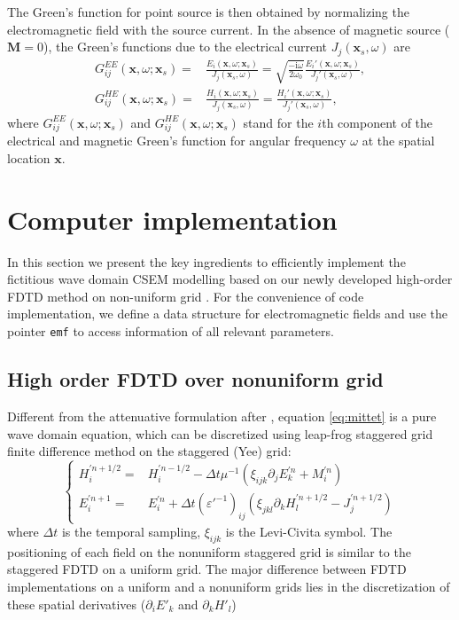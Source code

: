 \documentclass[a4paper,10pt]{article}
\begin{document}
The Green's function for point source is then obtained by normalizing the electromagnetic field with the source current. In the absence of magnetic source ($\mathbf{M}=0$),  the Green's functions due to the electrical current $J_j(\mathbf{x}_s,\omega)$ are
 \begin{subequations}\label{eq:greenfunction}
   \begin{align}
  G_{ij}^{EE}(\mathbf{x},\omega;\mathbf{x}_s) =& \frac{E_i(\mathbf{x},\omega;\mathbf{x}_s)}{J_j(\mathbf{x}_s,\omega)}
  =\sqrt{\frac{-\mathrm{i}\omega}{2\omega_0}}\frac{E_i'(\mathbf{x},\omega;\mathbf{x}_s)}{J_j'(\mathbf{x}_s,\omega)}, \\
  G_{ij}^{HE}(\mathbf{x},\omega;\mathbf{x}_s) = &\frac{H_i(\mathbf{x},\omega;\mathbf{x}_s)}{J_j(\mathbf{x}_s,\omega)}
  =\frac{H_i'(\mathbf{x},\omega;\mathbf{x}_s)}{J_j'(\mathbf{x}_s,\omega)},
  \end{align}
\end{subequations}
where  $G_{ij}^{EE}(\mathbf{x},\omega;\mathbf{x}_s)$ and $G_{ij}^{HE}(\mathbf{x},\omega;\mathbf{x}_s)$ stand for the $i$th component of the electrical and magnetic Green's function for angular frequency $\omega$ at the spatial location $\mathbf{x}$.



\section{Computer implementation}

In this section we present the key ingredients to efficiently implement the fictitious wave domain CSEM modelling based on our newly developed high-order FDTD method on non-uniform grid \citep{Yang_2023_HFDNU}. For the convenience of code implementation, we define a data structure for electromagnetic fields and use the pointer \verb|emf| to access information of all relevant parameters.

\subsection{High order FDTD over nonuniform grid}

Different from the attenuative formulation after \citep{Maao_2007_FFT}, equation \eqref{eq:mittet} is a pure wave domain equation, which can be discretized using leap-frog staggered grid finite difference method on the staggered (Yee) grid:
\begin{equation}
\begin{cases}
H_i^{'n+1/2} =& H_i^{'n-1/2} - \Delta t\mu^{-1} (\xi_{ijk}\partial_j 
E_k^{'n} + M_i^{'n})\\
 E_i^{'n+1} =&  E_i^{'n} + \Delta t (\varepsilon'^{-1})_{ij}
(\xi_{jkl}\partial_k H_l^{'n+1/2} -J_j^{'n+1/2}) 
\end{cases}
\end{equation}
where $\Delta t$ is the temporal sampling, $\xi_{ijk}$ is the Levi-Civita symbol. The positioning of each field on the nonuniform staggered grid  is similar to the staggered FDTD on a uniform grid. The major difference between FDTD implementations on a uniform and a nonuniform grids lies in the discretization of these spatial derivatives ($\partial_i E'_k$ and $\partial_k H'_l$)
\end{document}
